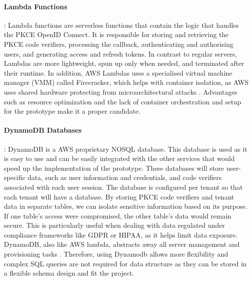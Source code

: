     \paragraph{Lambda Functions}: Lambda functions are serverless functions that contain the logic that handles the PKCE OpenID Connect. It is responsible for storing and retrieving the PKCE code verifiers, processing the callback, authenticating and authorising users, and generating access and refresh tokens. In contrast to regular servers, Lambdas are more lightweight, spun up only when needed, and terminated after their runtime. In addition, AWS Lambdas uses a specialised virtual machine manager (VMM) called Firecracker, which helps with container isolation, as AWS uses shared hardware protecting from microarchitectural attacks \citep{lambda_vm_firecracker}. Advantages such as resource optimization and the lack of container orchestration and setup for the prototype make it a proper candidate.
    
    \paragraph{DynamoDB Databases}: DynamoDB is a AWS proprietary NOSQL database. This database is used as it is easy to use and can be easily integrated with the other services that would speed up the implementation of the prototype. These databases will store user-specific data, such as user information and credentials, and code verifiers associated with each user session. The database is configured per tenant so that each tenant will have a database. By storing PKCE code verifiers and tenant data in separate tables, we can isolate sensitive information based on its purpose. If one table’s access were compromised, the other table’s data would remain secure. This is particularly useful when dealing with data regulated under compliance frameworks like GDPR or HIPAA, as it helps limit data exposure. DynamoDB, also like AWS lambda, abstracts away all server management and provisioning tasks \citep{dynamodb}. Therefore, using Dynamodb allows more flexibility and complex SQL queries are not required for data structure as they can be stored in a flexible schema design and fit the project.\newline

